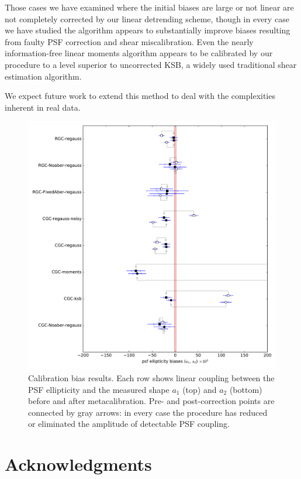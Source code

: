\documentclass[iop]{emulateapj}
\begin{document}
Those cases we have examined where the initial biases are large or not
linear are not completely corrected by our linear detrending scheme,
though in every case we have studied the algorithm appears to
substantially improve biases resulting from faulty PSF correction and
shear miscalibration. Even the nearly information-free linear moments
algorithm appears to be calibrated by our procedure to a level
superior to uncorrected KSB, a widely used traditional shear
estimation algorithm.

We expect future work to extend this method to deal with the
complexities inherent in real data.



\begin{figure}[t]
\begin{center}
\includegraphics[width=0.8\linewidth]{./Plots/a_results_linear.pdf}
\end{center}
\caption{Calibration bias results. Each row shows linear coupling
  between the PSF ellipticity and the measured shape $a_1$ (top) and
  $a_2$ (bottom) before and after metacalibration. Pre- and
  post-correction points are connected by gray arrows: in every case
  the procedure has reduced or eliminated the amplitude of detectable
  PSF coupling.}
\label{fig:a_results}
\end{figure}


\section*{Acknowledgments}
\end{document}
